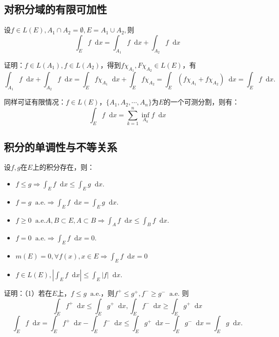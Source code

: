 \documentclass[bwprint, withoutpreface]{cumcmthesis}
\newcommand*{\dif}{\mathop{}\!\mathrm{d}}
\begin{document}
\subsection{对积分域的有限可加性}
设$f \in L(E), A_1 \cap A_2 = \emptyset, E = A_1 \cup A_2,$则 \[	\int_E f \dif x = \int_{A_1} f \dif x + \int_{A_2} f \dif x \]

证明：$f \in L(A_1), f \in L(A_2)$，得到$f\chi_{A_1}, F\chi_{A_2} \in L(E)$，有 \[ \int_{A_1} f \dif x + \int_{A_2} f \dif x = \int_E f \chi_{A_1} \dif x + \int_E f \chi_{A_2} = \int_E (f \chi_{A_1} + f \chi_{A_2}) \dif x = \int_E f \dif x. \]

同样可证有限情况：$f \in L(E)$，$\{A_1, A_2, \cdots, A_n\}$为$E$的一个可测分割，则有：
\begin{equation*}
	\int_E f \dif x = \sum_{k = 1}^{n}{\inf_{A_k}{f \dif x}}
\end{equation*}

\subsection{积分的单调性与不等关系}
设$f, g$在$E$上的积分存在，则：
\begin{itemize}[itemindent=2em]
	\item $f \leqslant g \Rightarrow \int_E f \dif x \leqslant \int_E g \dif x$.
	\item $f = g \mathop{} \! \mathrm{a.e.} \Rightarrow \int_E f \dif x = \int_E g \dif x$.
	\item $f \geqslant 0 \mathop{} \! \mathrm{a.e.} A, B \subset E, A \subset B \Rightarrow \int_A f \dif x \leqslant \int_B f \dif x$.
	\item $f = 0 \mathop{} \! \mathrm{a.e.} \Rightarrow \int_E f \dif x = 0$.
	\item $m(E) = 0, \forall f(x), x \in E \Rightarrow \int_E f \dif x = 0$
	\item $f \in L(E), |\int_E f \dif x| \leqslant \int_E |f| \dif x$.
\end{itemize}

证明：（1）若在$E$上，$f \leqslant g \mathop{} \! \mathrm{a.e.}$，则$f^+ \leqslant g^+, f^- \geqslant g^- \mathop{} \! \mathrm{a.e.}$ 则
\begin{equation*}
	\int_E f^+ \dif x \leqslant \int_E g^+ \dif x, \int_E f^- \dif x \geqslant \int_E g^+ \dif x
\end{equation*}
\begin{equation*}
	\int_E f \dif x = \int_E f^+ \dif x - \int_E f^- \dif x \leqslant \int_E g^+ \dif x - \int_E g^- \dif x = \int_E g \dif x.
\end{equation*}
\end{document}

